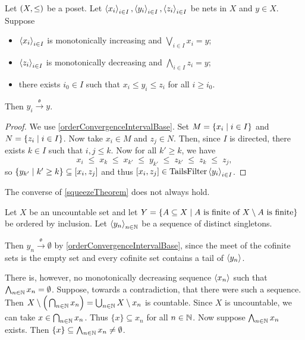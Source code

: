 \begin{proposition} \label{squeezeTheorem}
Let $\sSet{X,\leq}$ be a poset. Let $\left\langle x_i \right\rangle_{i\in I}, \left\langle y_i \right\rangle_{i\in I},\left\langle z_i \right\rangle_{i\in I}$ be nets in $X$ and $y\in X$.
Suppose
\begin{itemize}
\item $\left\langle x_i \right\rangle_{i\in I}$ is monotonically increasing and $\bigvee_{i\in I}x_i = y$;
\item $\left\langle z_i \right\rangle_{i\in I}$ is monotonically decreasing and $\bigwedge_{i\in I}z_i = y$;
\item there exists $i_0\in I$ such that $x_i \leq y_i \leq z_i$ for all $i\geq i_0$.
\end{itemize}
Then $y_i \overset{\mathfrak{o}}{\longrightarrow} y$.
\end{proposition}
\begin{proof}
We use \ref{orderConvergenceIntervalBase}. Set $M = \setbuilder{x_i}{i\in I}$ and $N = \setbuilder{z_i}{i\in I}$. Now take $x_i\in M$ and $z_j\in N$. Then, since $I$ is directed, there exists $k\in I$ such that $i,j\leq k$. Now for all $k'\geq k$, we have
\[ x_i \;\leq\; x_k \;\leq\; x_{k'} \;\leq\; y_{k'} \;\leq\; z_{k'} \;\leq\; z_k \;\leq\; z_j, \]
so $\setbuilder{y_{k'}}{k'\geq k} \subseteq \interval{x_i, z_j}$ and thus $\interval{x_i, z_j}\in\TailsFilter\seq{y_i}_{i\in I}$.
\end{proof}

\begin{example}
The converse of \ref{squeezeTheorem} does not always hold.

Let $X$ be an uncountable set and let $Y = \setbuilder{A\subseteq X}{\text{$A$ is finite of $X\setminus A$ is finite}}$ be ordered by inclusion. Let $\left\langle y_n \right\rangle_{n\in\mathbb{N}}$ be a sequence of distinct singletons.

Then $y_n \overset{\mathfrak{o}}{\longrightarrow} \emptyset$ by \ref{orderConvergenceIntervalBase}, since the meet of the cofinite sets is the empty set and every cofinite set contains a tail of $\left\langle y_n \right\rangle$.

There is, however, no monotonically decreasing sequence $\left\langle x_n \right\rangle$ such that $\bigwedge_{n\in\mathbb{N}}x_n = \emptyset$. Suppose, towards a contradiction, that there were such a sequence. Then $X\setminus \Big(\bigcap_{n\in \mathbb{N}}x_n\Big) = \bigcup_{n\in \mathbb{N}}X\setminus x_n$ is countable. Since $X$ is uncountable, we can take $x\in \bigcap_{n\in \mathbb{N}}x_n$. Thus $\{x\}\subseteq x_n$ for all $n\in \mathbb{N}$. Now suppose $\bigwedge_{n\in \mathbb{N}}x_n$ exists. Then $\{x\}\subseteq \bigwedge_{n\in \mathbb{N}}x_n \neq \emptyset$.
\end{example}

